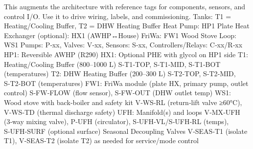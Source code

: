 \markdownRendererDocumentBegin
\markdownRendererSectionBegin
{}\markdownRendererInterblockSeparator
{}This augments the architecture with reference tags for components, sensors, and control I/O. Use it to drive wiring, labels, and commissioning.\markdownRendererInterblockSeparator
{}\markdownRendererSectionBegin
{}\markdownRendererInterblockSeparator
{}\markdownRendererUlBeginTight
\markdownRendererUlItem Tanks: T1 = Heating/Cooling Buffer, T2 = DHW Heating Buffer\markdownRendererUlItemEnd 
\markdownRendererUlItem Heat Pump: HP1\markdownRendererUlItemEnd 
\markdownRendererUlItem Plate Heat Exchanger (optional): HX1 (AWHP↔House)\markdownRendererUlItemEnd 
\markdownRendererUlItem FriWa: FW1\markdownRendererUlItemEnd 
\markdownRendererUlItem Wood Stove Loop: WS1\markdownRendererUlItemEnd 
\markdownRendererUlItem Pumps: P‑xx, Valves: V‑xx, Sensors: S‑xx, Controllers/Relays: C‑xx/R‑xx\markdownRendererUlItemEnd 
\markdownRendererUlEndTight \markdownRendererInterblockSeparator
{}
\markdownRendererSectionEnd \markdownRendererSectionBegin
{}\markdownRendererInterblockSeparator
{}\markdownRendererUlBeginTight
\markdownRendererUlItem HP1: Reversible AWHP (R290)\markdownRendererUlItemEnd 
\markdownRendererUlItem HX1: Optional PHE with glycol on HP1 side\markdownRendererUlItemEnd 
\markdownRendererUlItem T1: Heating/Cooling Buffer (800–1000 L)\markdownRendererUlItemEnd 
\markdownRendererUlItem S‑T1‑TOP, S‑T1‑MID, S‑T1‑BOT (temperatures)\markdownRendererUlItemEnd 
\markdownRendererUlItem T2: DHW Heating Buffer (200–300 L)\markdownRendererUlItemEnd 
\markdownRendererUlItem S‑T2‑TOP, S‑T2‑MID, S‑T2‑BOT (temperatures)\markdownRendererUlItemEnd 
\markdownRendererUlItem FW1: FriWa module (plate HX, primary pump, outlet control)\markdownRendererUlItemEnd 
\markdownRendererUlItem S‑FW‑FLOW (flow sensor), S‑FW‑OUT (DHW outlet temp)\markdownRendererUlItemEnd 
\markdownRendererUlItem WS1: Wood stove with back‑boiler and safety kit\markdownRendererUlItemEnd 
\markdownRendererUlItem V‑WS‑RL (return‑lift valve ≥60°C), V‑WS‑TD (thermal discharge safety)\markdownRendererUlItemEnd 
\markdownRendererUlItem UFH: Manifold(s) and loops\markdownRendererUlItemEnd 
\markdownRendererUlItem V‑MX‑UFH (3‑way mixing valve), P‑UFH (circulator), S‑UFH‑VL/S‑UFH‑RL (temps), S‑UFH‑SURF (optional surface)\markdownRendererUlItemEnd 
\markdownRendererUlItem Seasonal Decoupling Valves\markdownRendererUlItemEnd 
\markdownRendererUlItem V‑SEAS‑T1 (isolate T1), V‑SEAS‑T2 (isolate T2) as needed for service/mode control\markdownRendererUlItemEnd 
